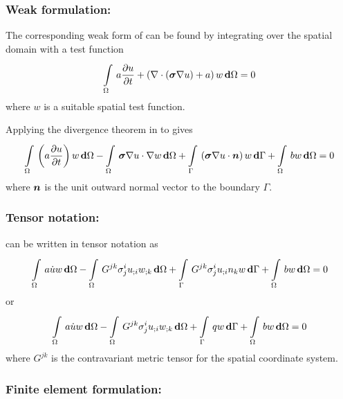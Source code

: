 \subsubsection{Weak formulation:}

The corresponding weak form of  can be found by
integrating over the spatial domain with a test function \ie
\begin{equation}
  \gint{\Omega}{}{a\delby{u}{t}+\pbrac{\divergence{}{\pbrac{\tensor{\sigma}
          \gradient{}{u}}}+a}w}{\Omega}=0
  \label{eqn:diffusionweakform1}
\end{equation}
where $w$ is a suitable spatial test function.

Applying the divergence theorem in 
to  gives
\begin{equation}
  \gint{\Omega}{}{\pbrac{a\delby{u}{t}}w}{\Omega}-
      \gint{\Omega}{}{\dotprod{\tensor{\sigma}\gradient{}{u}}{\gradient{}{w}}}{\Omega}
      +\gint{\Gamma}{}{\pbrac{\dotprod{\tensor{\sigma}\gradient{}{u}}{\normal}}w}{\Gamma}+
      \gint{\Omega}{}{bw}{\Omega}=0
  \label{eqn:diffusionweakform2}
\end{equation}
where $\boldsymbol{n}$ is the unit outward normal vector to the boundary $\Gamma$.

\subsubsection{Tensor notation:}

 can be written in tensor notation as
\begin{equation}
  \gint{\Omega}{}{a\dot{u}w}{\Omega}-
  \gint{\Omega}{}{G^{jk}\sigma^{i}_{j}\covarderiv{u}{i}\covarderiv{w}{k}}{\Omega}+
  \gint{\Gamma}{}{G^{jk}\sigma^{i}_{j}\covarderiv{u}{i}n_{k}w}{\Gamma} +
  \gint{\Omega}{}{bw}{\Omega}=0
  \label{eqn:diffusiontensorform1}
\end{equation}
or
\begin{equation}
  \gint{\Omega}{}{a\dot{u}w}{\Omega}-
  \gint{\Omega}{}{G^{jk}\sigma^{i}_{j}\covarderiv{u}{i}\covarderiv{w}{k}}{\Omega}+
  \gint{\Gamma}{}{qw}{\Gamma} +
  \gint{\Omega}{}{bw}{\Omega}=0
  \label{eqn:diffusiontensorform2}
\end{equation}
where $G^{jk}$ is the contravariant metric tensor for the spatial coordinate system.

\subsubsection{Finite element formulation:}

